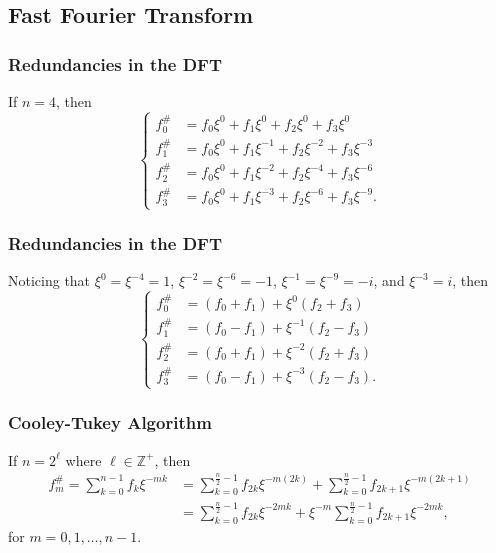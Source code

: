 \documentclass{beamer}
\begin{document}
\subsection{Fast Fourier Transform}
\begin{frame}
	\frametitle{Redundancies in the DFT}
	If $n=4$, then
	\begin{equation*}
		\begin{cases}
			f_{0}^{\#} &= f_0\xi^0 + f_1\xi^0 + f_2\xi^0 + f_3\xi^0 \\
			f_{1}^{\#} &= f_0\xi^0 + f_1\xi^{-1} + f_2\xi^{-2} + f_3\xi^{-3} \\
			f_{2}^{\#} &= f_0\xi^0 + f_1\xi^{-2} + f_2\xi^{-4} + f_3\xi^{-6} \\
			f_{3}^{\#} &= f_0\xi^0 + f_1\xi^{-3} + f_2\xi^{-6} + f_3\xi^{-9}.
		\end{cases}
	\end{equation*}
\end{frame}
\begin{frame}
	\frametitle{Redundancies in the DFT}
	Noticing that $\xi^0 = \xi^{-4} = 1$, $\xi^{-2} = \xi^{-6} = -1$, $\xi^{-1} = \xi^{-9} = -i$, and $\xi^{-3} = i$, then
\begin{equation*}
	\begin{cases}
		f_{0}^{\#} &= (f_0 + f_1) + \xi^0(f_2 + f_3) \\
		f_{1}^{\#} &= (f_0 - f_1) + \xi^{-1}(f_2 - f_3) \\
		f_{2}^{\#} &= (f_0 + f_1) + \xi^{-2}(f_2 + f_3) \\
		f_{3}^{\#} &= (f_0 - f_1) + \xi^{-3}(f_2 - f_3).
	\end{cases}
\end{equation*}
\end{frame}
\begin{frame}
	\frametitle{Cooley-Tukey Algorithm}
	If $n = 2^{\ell}$ where $\ell \in \mathbb{Z}^+$, then
	\begin{equation*}
		\begin{aligned}
			f_{m}^{\#} = \sum_{k=0}^{n-1}{f_k\xi^{-mk}} &= \sum_{k=0}^{\frac{n}{2}-1}{f_{2k}\xi^{-m(2k)}} + \sum_{k=0}^{\frac{n}{2}-1}{f_{2k + 1}\xi^{-m(2k+1)}} \\
			&= \sum_{k=0}^{\frac{n}{2}-1}{f_{2k}\xi^{-2mk}} + \xi^{-m}\sum_{k=0}^{\frac{n}{2}-1}{f_{2k + 1}\xi^{-2mk}},
		\end{aligned}
	\end{equation*}
	for $m = 0,1,\dots,n-1$.
\end{frame}
\end{document}

